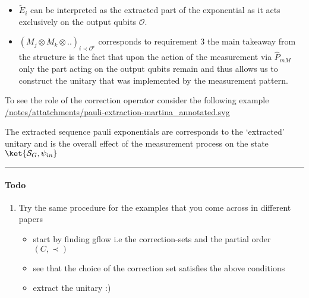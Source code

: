 \documentclass[
]{article}
\providecommand{\tightlist}{%
  \setlength{\itemsep}{0pt}\setlength{\parskip}{0pt}}
\begin{document}
\begin{itemize}
\tightlist
\item
  \(\tilde{E}_i\) can be interpreted as the extracted part of the
  exponential as it acts exclusively on the output qubits
  \(\mathcal{O}\).
\item
  \(\left(M_{j}\otimes M_{k}\otimes .. \right)_{i \prec \mathcal{O}^{c}}\)
  corresponds to requirement 3 the main takeaway from the structure is
  the fact that upon the action of the measurement via \(\hat{P}_{mM}\)
  only the part acting on the output qubits remain and thus allows us to
  construct the unitary that was implemented by the measurement pattern.
\end{itemize}

To see the role of the correction operator consider the following
example
\href{shared-repos/mb-vqa/notes/attatchments/pauli-extraction-martina_annotated.svg}{/notes/attatchments/pauli-extraction-martina_annotated.svg}

The extracted sequence pauli exponentials are corresponds to the
`extracted' unitary and is the overall effect of the measurement process
on the state \(\ket{\mathcal{S}_G, \psi_{in}}\)

\begin{center}\rule{0.5\linewidth}{0.5pt}\end{center}

\hypertarget{todo}{%
\paragraph{Todo}\label{todo}}

\begin{enumerate}
\def\labelenumi{\arabic{enumi}.}
\tightlist
\item
  Try the same procedure for the examples that you come across in
  different papers

  \begin{itemize}
  \tightlist
  \item
    start by finding gflow i.e the correction-sets and the partial order
    \((C, \prec)\)
  \item
    see that the choice of the correction set satisfies the above
    conditions
  \item
    extract the unitary :)
  \end{itemize}
\end{enumerate}
\end{document}
